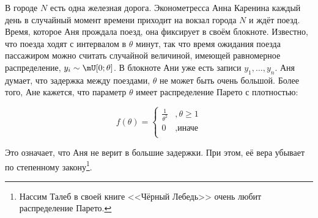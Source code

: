 \begin{problem}
В городе $N$ есть одна железная дорога. Эконометресса Анна Каренина каждый день в случайный момент времени приходит на вокзал города $N$ и ждёт поезд. Время, которое Аня прождала поезд, она фиксирует в своём блокноте. Известно, что поезда ходят с интервалом в $\theta$ минут, так что время ожидания поезда пассажиром можно считать случайной величиной, имеющей равномерное распределение, $y_i \sim \mU[0;\theta]$. В блокноте Ани уже есть записи $y_1,\ldots, y_n$. Аня думает, что задержка между поездами, $\theta$ не может быть очень большой. Более того, Ане кажется, что параметр $\theta$ имеет распределение Парето с плотностью: 

\begin{figure}[H]
\begin{minipage}[H]{0.39\linewidth}
\begin{center}
\[ f(\theta) = \begin{cases}
\frac{1}{\theta^2} &, \theta \ge 1 \\
0 &, \text{иначе}\\
\end{cases} \]
\end{center}
\end{minipage}
\hfill
\begin{minipage}[H]{0.59\linewidth}
\begin{center}
\end{center}
\end{minipage}
\end{figure}

Это означает, что Аня не верит в большие задержки. При этом, её вера убывает по степенному закону\footnote{Нассим Талеб в своей книге <<Чёрный Лебедь>> очень любит распределение Парето.}.


\end{problem}
